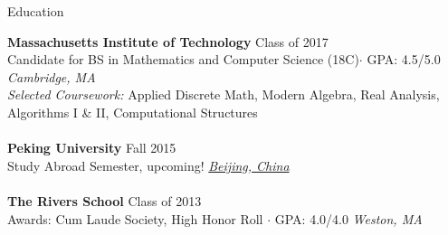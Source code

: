 \documentclass{resume} %
\begin{document}

\begin{rSection}{Education}

{\bf Massachusetts Institute of Technology} \hfill Class of 2017
\\ Candidate for BS in Mathematics and Computer Science (18C)$\cdot$ GPA: 4.5/5.0 \hfill {\em Cambridge, MA}
\\ {\em Selected Coursework:} 
Applied Discrete Math, Modern Algebra, Real Analysis, 
Algorithms I \& II, Computational Structures
\\
\\ {\bf Peking University} \hfill Fall 2015
\\ Study Abroad Semester, upcoming! \hfill \underline{\em Beijing, China}
\\
\\ {\bf The Rivers School} \hfill  Class of 2013
\\ Awards: Cum Laude Society, High Honor Roll $\cdot$ GPA: 4.0/4.0 \hfill {\em Weston, MA}

\end{rSection}

\end{document}
